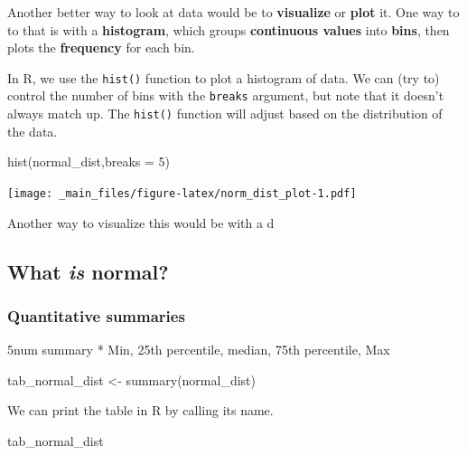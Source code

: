 \documentclass[
]{book}
\newenvironment{Shaded}{\begin{snugshade}}{\end{snugshade}}
\newcommand{\AttributeTok}[1]{\textcolor[rgb]{0.77,0.63,0.00}{#1}}
\newcommand{\DecValTok}[1]{\textcolor[rgb]{0.00,0.00,0.81}{#1}}
\newcommand{\FunctionTok}[1]{\textcolor[rgb]{0.00,0.00,0.00}{#1}}
\newcommand{\NormalTok}[1]{#1}
\newcommand{\OtherTok}[1]{\textcolor[rgb]{0.56,0.35,0.01}{#1}}
\begin{document}
Another better way to look at data would be to \textbf{visualize} or \textbf{plot} it. One way to to that is with a \textbf{histogram}, which groups \textbf{continuous values} into \textbf{bins}, then plots the \textbf{frequency} for each bin.

In R, we use the \texttt{hist()} function to plot a histogram of data. We can (try to) control the number of bins with the \texttt{breaks} argument, but note that it doesn't always match up. The \texttt{hist()} function will adjust based on the distribution of the data.

\begin{Shaded}
\begin{Highlighting}[]
\FunctionTok{hist}\NormalTok{(normal\_dist,}\AttributeTok{breaks =} \DecValTok{5}\NormalTok{)}
\end{Highlighting}
\end{Shaded}

\texttt{[image: \_main\_files/figure-latex/norm\_dist\_plot-1.pdf]}

Another way to visualize this would be with a d

\hypertarget{what-is-normal}{%
\subsection{\texorpdfstring{What \emph{is} normal?}{What is normal?}}\label{what-is-normal}}

\hypertarget{quantitative-summaries}{%
\subsubsection{Quantitative summaries}\label{quantitative-summaries}}

5num summary
* Min, 25th percentile, median, 75th percentile, Max

\begin{Shaded}
\begin{Highlighting}[]
\NormalTok{tab\_normal\_dist }\OtherTok{\textless{}{-}} \FunctionTok{summary}\NormalTok{(normal\_dist)}
\end{Highlighting}
\end{Shaded}

We can print the table in R by calling its name.

\begin{Shaded}
\begin{Highlighting}[]
\NormalTok{tab\_normal\_dist}
\end{Highlighting}
\end{Shaded}
\end{document}
